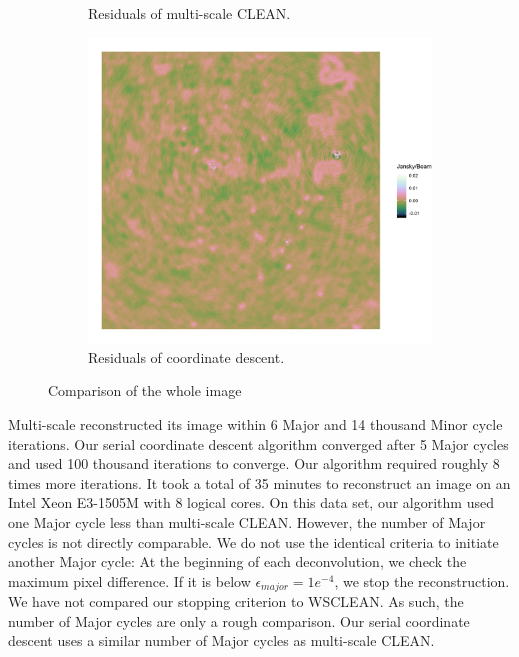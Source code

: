 \begin{figure}[h]
\begin{subfigure}[b]{0.49\linewidth}
		\caption{Residuals of multi-scale CLEAN.}
		\label{results:comp:clean-res}
	\end{subfigure}
	\begin{subfigure}[b]{0.49\linewidth}
		\includegraphics[width=1.00\linewidth, clip, trim={0.36in 0.36in 0.0in 0.36in}]{./chapters/10.results/SerialCD/CD-reference-residuals.png}
		\caption{Residuals of coordinate descent.}
		\label{results:comp:cd-res}
	\end{subfigure}

	\caption{Comparison of the whole image}
	\label{results:cleancomp:figure}
\end{figure}

\newpage

Multi-scale reconstructed its image within 6 Major and 14 thousand Minor cycle iterations. Our serial coordinate descent algorithm converged after 5 Major cycles and used 100 thousand iterations to converge. Our algorithm required roughly 8 times more iterations. It took a total of 35 minutes to reconstruct an image on an Intel Xeon E3-1505M with 8 logical cores. On this data set, our algorithm used one Major cycle less than multi-scale CLEAN. However, the number of Major cycles is not directly comparable. We do not use the identical criteria to initiate another Major cycle: At the beginning of each deconvolution, we check the maximum pixel difference. If it is below $\epsilon_{major} = 1e^{-4}$, we stop the reconstruction. We have not compared our stopping criterion to WSCLEAN. As such, the number of Major cycles are only a rough comparison. Our serial coordinate descent uses a similar number of Major cycles as multi-scale CLEAN.

